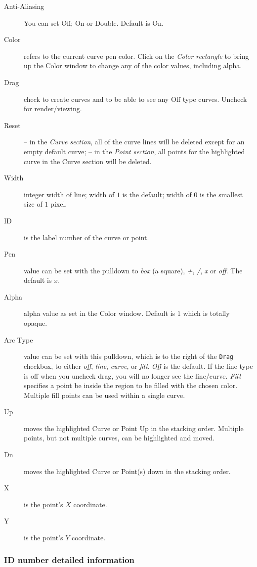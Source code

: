 {\begin{description}
	\item[Anti-Aliasing] You can set Off; On or Double. Default is On.
    \item[Color] refers to the current curve pen color. Click on the \textit{Color rectangle} to bring up the Color window to change any of the color values, including alpha.
    \item[Drag] check to create curves and to be able to see any Off type curves. Uncheck for render/viewing.
    \item[Reset] -- in the \textit{Curve section}, all of the curve lines will be deleted except for an empty default curve;
    -- in the \textit{Point section}, all points for the highlighted curve in the Curve section will be deleted.
    \item[Width] integer width of line; width of $1$ is the default; width of $0$ is the smallest size of $1$ pixel.
    \item[ID] is the label number of the curve or point.
    \item[Pen] value can be set with the pulldown to \textit{box} (a square), \textit{+}, \textit{/}, \textit{x} or \textit{off}. The default is \textit{x}.
    \item[Alpha] alpha value as set in the Color window. Default is $1$ which is totally opaque.
    \item[Arc Type] value can be set with this pulldown, which is to the right of the \texttt{Drag} checkbox, to either \textit{off}, \textit{line}, \textit{curve}, or \textit{fill}. \textit{Off} is the default. If the line type is off when you uncheck drag, you will no longer see the line/curve. \textit{Fill} specifies a point be inside the region to be filled with the chosen color. Multiple fill points can be used within a single curve.
    \item[Up] moves the highlighted Curve or Point Up in the stacking order. Multiple points, but not multiple curves, can be highlighted and moved.
    \item[Dn] moves the highlighted Curve or Point(s) down in the stacking order.
    \item[X] is the point’s $X$ coordinate.
    \item[Y] is the point’s $Y$ coordinate.
\end{description}

\subsubsection*{ID number detailed information}%
\label{ssub:id_number_detailed_information}

}

